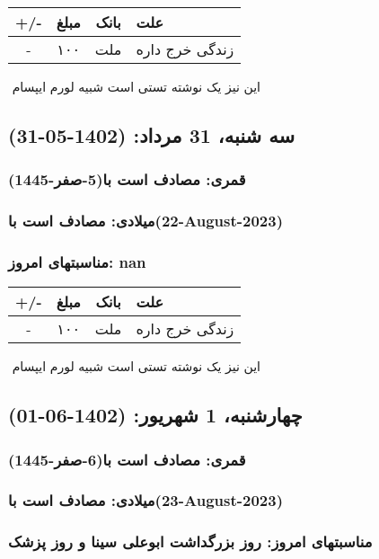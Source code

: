 \documentclass{article}
\newcommand{\rnote}[1]{\marginpar{\textcolor{color}{\StrSubstitute{\##1}{ }{\_}}}}
\newcommand{\myRow}[4]{
    #1 & #2 & #3 & #4 \\ \hline
}
\begin{document}
\begin{tabular}{ | c | c | c | p{5cm} |}
    \hline
    \myRow{ +/- }{مبلغ}{بانک}{علت}
    \myRow{-}{۱۰۰}{ملت}{زندگی خرج داره}
\end{tabular}
\newline
\newline

‌
\rnote{تست}
این نیز یک نوشته تستی است شبیه لورم ایپسام




\newpage
{}
\textcolor{color}{
\section{ سه شنبه، 31 مرداد: (1402-05-31) }
\subsubsection*{قمری: مصادف است با(5-صفر-1445)} 
\subsubsection*{میلادی: مصادف است با(22-August-2023)}
\subsubsection*{مناسبتهای امروز: nan}
}


\begin{tabular}{ | c | c | c | p{5cm} |}
    \hline
    \myRow{ +/- }{مبلغ}{بانک}{علت}
    \myRow{-}{۱۰۰}{ملت}{زندگی خرج داره}
\end{tabular}
\newline
\newline

‌
\rnote{تست}
این نیز یک نوشته تستی است شبیه لورم ایپسام




\newpage
{}
\textcolor{color}{
\section{ چهارشنبه، 1 شهریور: (1402-06-01) }
\subsubsection*{قمری: مصادف است با(6-صفر-1445)} 
\subsubsection*{میلادی: مصادف است با(23-August-2023)}
\subsubsection*{مناسبتهای امروز: روز بزرگداشت ابوعلی سینا و روز پزشک}
}
\end{document}
